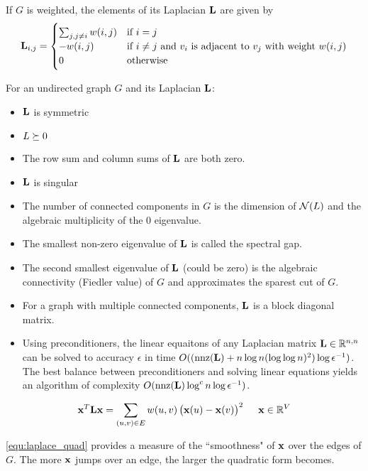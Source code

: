 If $G$ is weighted, the elements of its Laplacian $\mathbf{L}$ are given by
\begin{equation}
\mathbf{L}_{i,j} = \begin{cases}
  \sum_{j,j\ne i} w(i,j) & \textrm{if $i=j$} \\
  -w(i,j)   & \textrm{if $i\ne j$ and $v_i$ is adjacent to $v_j$ with weight $w(i,j)$} \\
   0        & \textrm{otherwise}
\end{cases}
\end{equation}

For an undirected graph $G$ and its Laplacian $\mathbf{L}$:
\begin{itemize}
\item $\mathbf{L}$ is symmetric
\item $L\succeq 0$
\item The row sum and column sums of $\mathbf{L}$ are both zero.
\item $\mathbf{L}$ is singular
\item The number of connected components in $G$ is the dimension of $\mathcal{N}(L)$ and the algebraic multiplicity of the 0 eigenvalue.
\item The smallest non-zero eigenvalue of $\mathbf{L}$ is called the spectral gap.
\item The second smallest eigenvalue of $\mathbf{L}$ (could be zero) is the algebraic connectivity (Fiedler value) of $G$ and approximates the sparest cut of $G$.
\item For a graph with multiple connected components, $\mathbf{L}$ is a block diagonal matrix.
\item Using preconditioners, the linear equaitons of any Laplacian matrix $\mathbf{L}\in\mathbb{R}^{n,n}$ can be solved to accuracy $\epsilon$ in time $O((\operatorname{nnz}(\mathbf{L}) + n\log n (\log \log n)^2) \log \epsilon^{-1})$. The best balance between preconditioners and solving linear equations yields an algorithm of complexity $O(\operatorname{nnz}(\mathbf{L}) \log^c n \log \epsilon^{-1})$.~\citep{Spielman2010}
\end{itemize}

\begin{align}
\mathbf{x}^T \mathbf{L} \mathbf{x} = \sum_{(u,v)\in E} w(u,v) \left(\mathbf{x}(u)-\mathbf{x}(v)\right)^2~~~~\mathbf{x}\in\mathbb{R}^{V} \label{equ:laplace_quad}
\end{align}

\autoref{equ:laplace_quad} provides a measure of the ``smoothness" of $\mathbf{x}$ over the edges of $G$. The more $\mathbf{x}$ jumps over an edge, the larger the quadratic form becomes.





